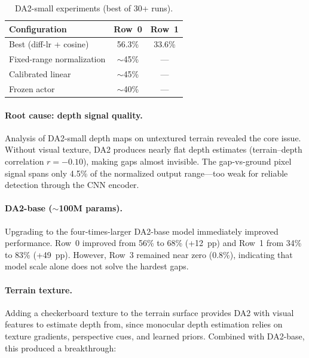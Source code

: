 \documentclass[10pt,twocolumn]{article}
\begin{document}
\begin{table}[h]
  \centering
  \caption{DA2-small experiments (best of 30+ runs).}
  \label{tab:da2_small}
  \small
  \begin{tabular}{@{}lcc@{}}
    \toprule
    Configuration & Row~0 & Row~1 \\
    \midrule
    Best (diff-lr + cosine) & 56.3\% & 33.6\% \\
    Fixed-range normalization & $\sim$45\% & --- \\
    Calibrated linear & $\sim$45\% & --- \\
    Frozen actor & $\sim$40\% & --- \\
    \bottomrule
  \end{tabular}
\end{table}

\paragraph{Root cause: depth signal quality.}
Analysis of DA2-small depth maps on untextured terrain revealed
the core issue.  Without visual texture, DA2 produces nearly flat
depth estimates (terrain--depth correlation $r = -0.10$), making
gaps almost invisible.  The gap-vs-ground pixel signal spans only
4.5\% of the normalized output range---too weak for reliable
detection through the CNN encoder.

\paragraph{DA2-base ($\sim$100M params).}
Upgrading to the four-times-larger DA2-base model immediately
improved performance.  Row~0 improved from 56\% to 68\% (+12~pp)
and Row~1 from 34\% to 83\% (+49~pp).  However, Row~3 remained
near zero (0.8\%), indicating that model scale alone does not solve
the hardest gaps.

\paragraph{Terrain texture.}
Adding a checkerboard texture to the terrain surface provides DA2
with visual features to estimate depth from, since monocular depth
estimation relies on texture gradients, perspective cues, and
learned priors.  Combined with DA2-base, this produced a
breakthrough:
\end{document}
